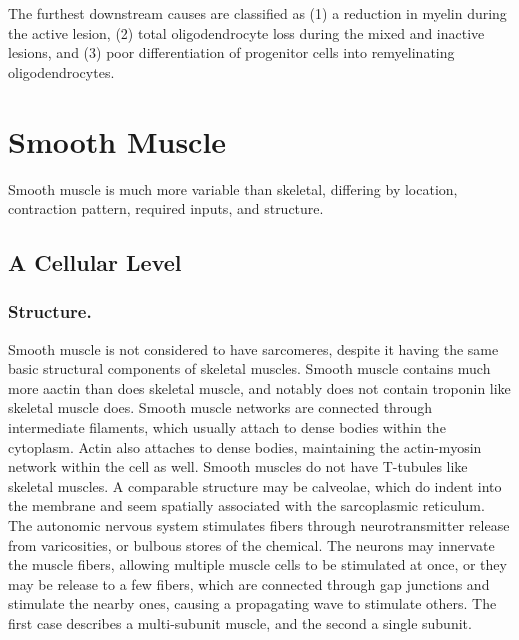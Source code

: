 The furthest downstream causes are classified as (1) a reduction in myelin during the active lesion, (2) total oligodendrocyte loss during the mixed and inactive lesions, and (3) poor differentiation of progenitor cells into remyelinating oligodendrocytes. 



\section{Smooth Muscle}

Smooth muscle is much more variable than skeletal, differing by location, contraction pattern, required inputs, and structure. 


\subsection{A Cellular Level}
\subsubsection{Structure.}
Smooth muscle is not considered to have sarcomeres, despite it having the same basic structural components of skeletal muscles. Smooth muscle contains much more aactin than does skeletal muscle, and notably does not contain troponin like skeletal muscle does. Smooth muscle networks are connected through intermediate filaments, which usually attach to dense bodies within the cytoplasm. Actin also attaches to dense bodies, maintaining the actin-myosin network within the cell as well. Smooth muscles do not have T-tubules like skeletal muscles. A comparable structure may be calveolae, which do indent into the membrane and seem spatially associated with the sarcoplasmic reticulum. The autonomic nervous system stimulates fibers through neurotransmitter release from varicosities, or bulbous stores of the chemical. The neurons may innervate the muscle fibers, allowing multiple muscle cells to be stimulated at once, or they may be release to a few fibers, which are connected through gap junctions and stimulate the nearby ones, causing a propagating wave to stimulate others. The first case describes a multi-subunit muscle, and the second a single subunit. 


